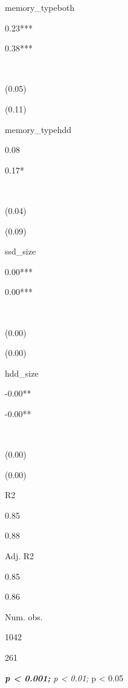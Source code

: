 \documentclass[
]{article}
\begin{document}
memory\_typeboth

0.23***

0.38***

~

(0.05)

(0.11)

memory\_typehdd

0.08

0.17*

~

(0.04)

(0.09)

ssd\_size

0.00***

0.00***

~

(0.00)

(0.00)

hdd\_size

-0.00**

-0.00**

~

(0.00)

(0.00)

R2

0.85

0.88

Adj. R2

0.85

0.86

Num. obs.

1042

261

\emph{\textbf{p \textless{} 0.001; }p \textless{} 0.01; }p \textless{}
0.05
\end{document}
